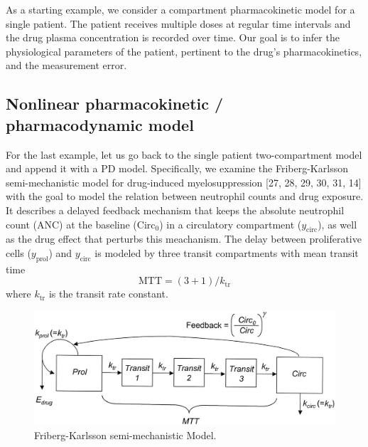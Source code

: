
As a starting example, we consider a compartment pharmacokinetic model for a single patient.
The patient receives multiple doses at regular time intervals and the drug plasma concentration is recorded over time.
Our goal is to infer the physiological parameters of the patient, pertinent to the drug's pharmacokinetics, and the measurement error.

\subsection{Nonlinear pharmacokinetic / pharmacodynamic model} 
For the last example, let us go back to the single patient
two-compartment model and append it with a PD
model. Specifically, we examine the
Friberg-Karlsson semi-mechanistic model for drug-induced
myelosuppression [27, 28, 29, 30, 31, 14] with the goal to model the
relation between neutrophil counts and drug exposure.
It describes a delayed feedback mechanism that keeps the absolute neutrophil count (ANC) at the
baseline ($\text{Circ}_0$) in a circulatory compartment ($y_{\text{circ}}$), as well as the drug
effect that perturbs this meachanism. The delay between
proliferative cells ($y_{\text{prol}}$) and $y_{\text{circ}}$ is modeled by three
transit compartments with mean transit time
\begin{equation}
  \text{MTT} = (3 + 1)/k_{\text{tr}}
\end{equation}
where $k_{\text{tr}}$ is the transit rate constant.
\begin{figure}
  \begin{center}
  \includegraphics[width=5in]{../figures/neutrophilModel.jpg}
  \caption{Friberg-Karlsson semi-mechanistic Model.}
  \label{fig:fk_model}
  \end{center}
\end{figure}

